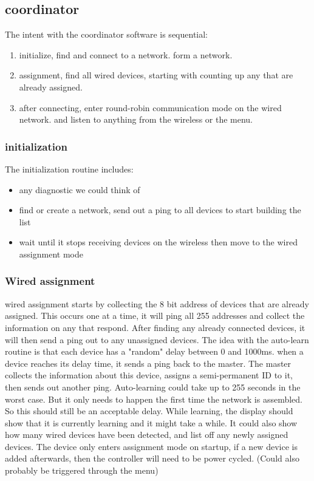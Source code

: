 \documentclass{article}
\begin{document}
     \subsection{coordinator}
     The intent with the coordinator software is sequential:
     \begin{enumerate}
     	\item initialize, find and connect to a network. form a network.
     	\item assignment, find all wired devices, starting with counting up any that are already assigned.
     	\item after connecting, enter round-robin communication mode on the wired network. and listen to anything from the wireless or the menu.
     \end{enumerate}
     \subsubsection{initialization}
     The initialization routine includes:
     \begin{itemize}
     	\item any diagnostic we could think of
		\item find or create a network, send out a ping to all devices to start building the list
     	\item wait until it stops receiving devices on the wireless then move to the wired assignment mode
     \end{itemize}
     
     \subsubsection{Wired assignment}
     wired assignment starts by collecting the 8 bit address of devices that are already assigned.
     This occurs one at a time, it will ping all 255 addresses and collect the information on any that respond.
     After finding any already connected devices, it will then send a ping out to any unassigned devices.
     The idea with the auto-learn routine is that each device has a "random" delay between 0 and 1000ms.
     when a device reaches its delay time, it sends a ping back to the master.
     The master collects the information about this device, assigns a semi-permanent ID to it, then sends out another ping.
     Auto-learning could take up to 255 seconds in the worst case. But it only needs to happen the first time the network is assembled.
     So this should still be an acceptable delay.
     While learning, the display should show that it is currently learning and it might take a while.
     It could also show how many wired devices have been detected, and list off any newly assigned devices.
     The device only enters assignment mode on startup, if a new device is added afterwards, then the controller will need to be power cycled.
     (Could also probably be triggered through the menu)
     
\end{document}
